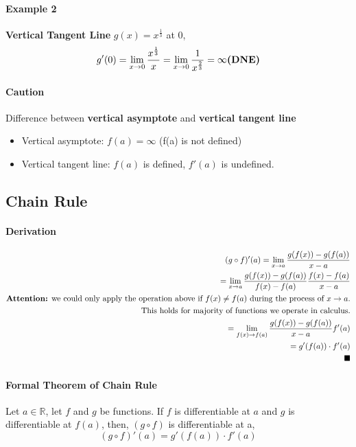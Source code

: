 \documentclass{article}
\begin{document}
	\paragraph{Example 2} \textbf{Vertical Tangent Line} $g(x) = x ^ {\frac{1}{3}}$ at 0,
	\[
		g'(0) = \lim_{x \to 0}\frac{x^{\frac{1}{3}}}{x} \\
		= \lim_{x \to 0} \frac{1}{x^{\frac{2}{3}}} = \infty \textbf{(DNE)}\\
	\]
	\paragraph{Caution} Difference between \textbf{vertical asymptote} and \textbf{vertical tangent line}
	\begin{itemize}
		\item Vertical asymptote: $f(a) = \infty$ (f(a) is not defined)
		\item Vertical tangent line: $f(a)$ is defined, $f'(a)$ is undefined.
	\end{itemize}
	\subsection{Chain Rule}
	\paragraph{Derivation}
	\begin{align*}
		(g \circ f)'(a) = \lim_{x \to a}\frac{g(f(x)) - g(f(a))}{x-a} \\
		= \lim_{x \to a}\frac{g(f(x)) - g(f(a))}{f(x) - f(a)} \frac{f(x) - f(a)}{x-a} \\
		\text{\textbf{Attention:} we could only apply the operation above if $f(x) \neq f(a)$ during the process of $x \to a$.} \\
		\text{This holds for majority of functions we operate in calculus.} \\
		= \lim_{f(x) \to f(a)}\frac{g(f(x)) - g(f(a))}{x-a} f'(a) \\
		= g'(f(a)) \cdot f'(a) \\
		\blacksquare
	\end{align*}
	\paragraph{Formal Theorem of Chain Rule} Let $a \in \mathbb{R}$, let $f$ and $g$ be functions. If $f$ is differentiable at $a$ and $g$ is differentiable at $f(a)$, then, $(g \circ f)$ is differentiable at a,
	\[
	(g \circ f)'(a) = g'(f(a)) \cdot f'(a)
	\]
\end{document}
